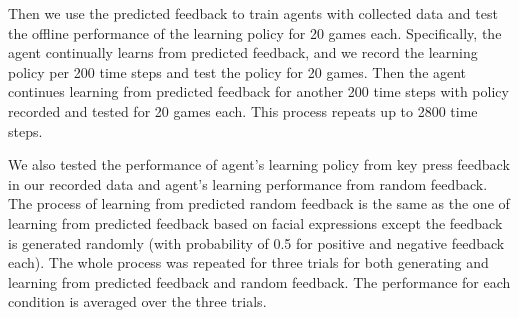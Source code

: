 Then we use the predicted feedback to train agents with collected data and test the offline performance of the learning policy for 20 games each. Specifically, the agent continually learns from predicted feedback, and we record the learning policy per 200 time steps and test the policy for 20 games. Then the agent continues learning from predicted feedback for another 200 time steps with policy recorded and tested for 20 games each. This process repeats up to 2800 time steps. %

We also tested the performance of agent's learning policy from key press feedback in our recorded data and agent's learning performance from random feedback. The process of learning from predicted random feedback is the same as the one of learning from predicted feedback based on facial expressions except the feedback is generated randomly (with probability of 0.5 for positive and negative feedback each). The whole process was repeated for three trials for both generating and learning from predicted feedback and random feedback. The performance for each condition is averaged over the three trials.  %


